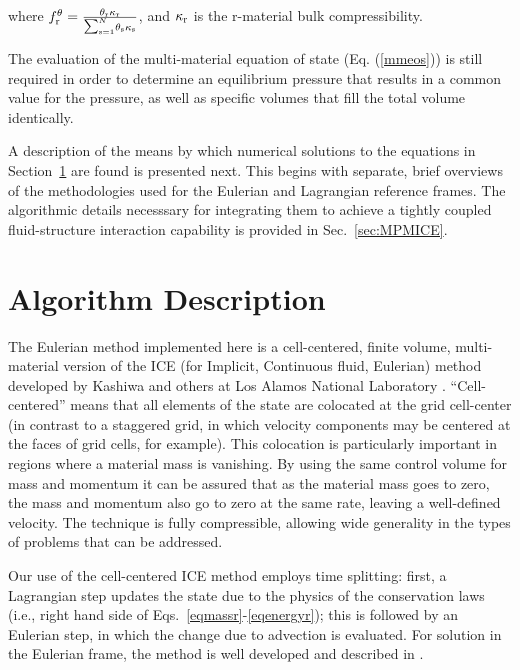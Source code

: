 where $f_\rmr^{\theta} = {{\theta_\rmr \kappa_\rmr} \over
{\raise1pt\hbox{${\scriptstyle\sum_{\rms =1}^N}$}} \theta_\rms\kappa_\rms}$,
and $\kappa_\rmr$ is the r-material bulk compressibility.

The evaluation of the multi-material equation of state (Eq. (\ref{mmeos}))
is still required in order to determine an equilibrium pressure that results
in a common value for the  pressure, as well as specific volumes that fill
the total volume identically.

A description of the means by which numerical solutions to the equations in
Section~\ref{sec:ICE:algorithm} are found is presented next.  This begins
with separate, brief overviews of the methodologies used for the Eulerian
and Lagrangian reference frames.  The algorithmic details necesssary for
integrating them to achieve a tightly coupled fluid-structure interaction
capability is provided in Sec.~\ref{sec:MPMICE}.

\section{Algorithm Description}\label{sec:ICE:algorithm}

The Eulerian method implemented here is a cell-centered, finite volume,
multi-material version of the ICE (for Implicit, Continuous fluid, Eulerian)
method \cite{harlowamsden68} developed by Kashiwa and others at Los Alamos
National Laboratory \cite{kashiwaCCICE94}.  ``Cell-centered'' means that all
elements of the state are colocated at the grid cell-center (in contrast to
a staggered grid, in which velocity components may be centered at the faces
of grid cells, for example).  This colocation is particularly important
in regions where a material mass is vanishing.  By using the same control
volume for mass and momentum it can be assured that as the material mass goes
to zero, the mass and momentum also go to zero at the same rate, leaving a
well-defined velocity.  The technique is fully compressible, allowing wide
generality in the types of problems that can be addressed.
 
Our use of the cell-centered ICE method employs time splitting: first,
a Lagrangian step updates the state due to the physics of the conservation
laws (i.e., right hand side of Eqs.~{\ref{eqmassr}-\ref{eqenergyr}}); this
is followed by an Eulerian step, in which the change due to advection is
evaluated.  For solution in the Eulerian frame, the method is well developed
and described in \cite{kashiwaCCICE94}.

